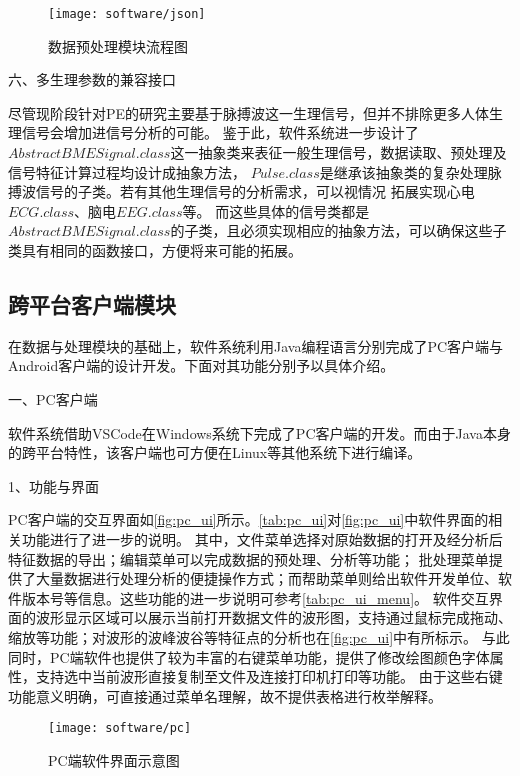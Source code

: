 \begin{figure}[htbp]
    \centering
    \texttt{[image: software/json]}
    \caption{\label{fig:json}数据预处理模块流程图}
\end{figure}

六、多生理参数的兼容接口

尽管现阶段针对PE的研究主要基于脉搏波这一生理信号，但并不排除更多人体生理信号会增加进信号分析的可能。
鉴于此，软件系统进一步设计了$AbstractBMESignal.class$这一抽象类来表征一般生理信号，数据读取、预处理及信号特征计算过程均设计成抽象方法，
$Pulse.class$是继承该抽象类的复杂处理脉搏波信号的子类。若有其他生理信号的分析需求，可以视情况
拓展实现心电$ECG.class$、脑电$EEG.class$等。
而这些具体的信号类都是$AbstractBMESignal.class$的子类，且必须实现相应的抽象方法，可以确保这些子类具有相同的函数接口，方便将来可能的拓展。

\subsection{跨平台客户端模块}

在数据与处理模块的基础上，软件系统利用Java编程语言分别完成了PC客户端与Android客户端的设计开发。下面对其功能分别予以具体介绍。

一、PC客户端

软件系统借助VSCode在Windows系统下完成了PC客户端的开发。而由于Java本身的跨平台特性，该客户端也可方便在Linux等其他系统下进行编译。

1、功能与界面

PC客户端的交互界面如\autoref{fig:pc_ui}所示。\autoref{tab:pc_ui}对\autoref{fig:pc_ui}中软件界面的相关功能进行了进一步的说明。
其中，文件菜单选择对原始数据的打开及经分析后特征数据的导出；编辑菜单可以完成数据的预处理、分析等功能；
批处理菜单提供了大量数据进行处理分析的便捷操作方式；而帮助菜单则给出软件开发单位、软件版本号等信息。这些功能的进一步说明可参考\autoref{tab:pc_ui_menu}。
软件交互界面的波形显示区域可以展示当前打开数据文件的波形图，支持通过鼠标完成拖动、缩放等功能；对波形的波峰波谷等特征点的分析也在\autoref{fig:pc_ui}中有所标示。
与此同时，PC端软件也提供了较为丰富的右键菜单功能，提供了修改绘图颜色字体属性，支持选中当前波形直接复制至文件及连接打印机打印等功能。
由于这些右键功能意义明确，可直接通过菜单名理解，故不提供表格进行枚举解释。

\begin{figure}[htbp]
    \centering
    \texttt{[image: software/pc]}
    \caption{\label{fig:pc_ui}PC端软件界面示意图}
\end{figure}

